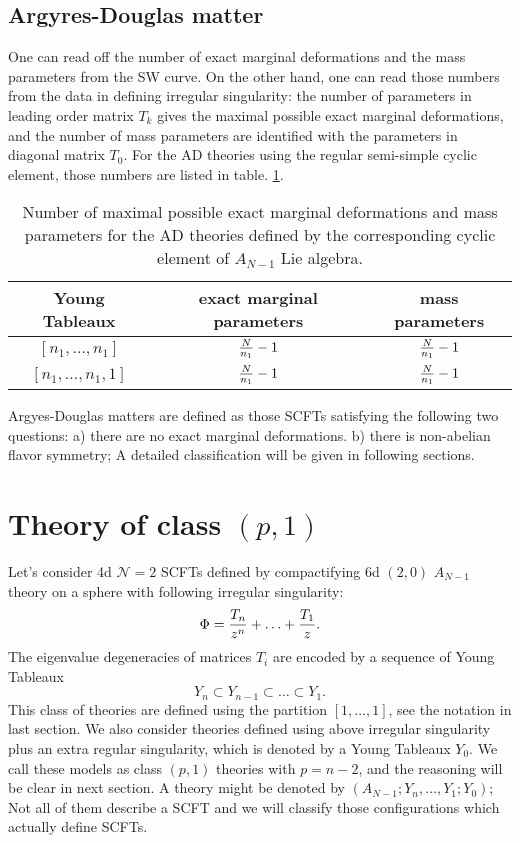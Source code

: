 \documentclass[a4paper,11pt]{article}
\begin{document}
\subsection{Argyres-Douglas matter}
One can read off the number of exact marginal deformations and the mass parameters from the SW curve. On the other hand, one can read those numbers from 
the data in defining irregular singularity: the number of parameters in leading order matrix $T_k$ gives the maximal possible exact marginal deformations, and  the number of mass parameters 
are identified with the parameters in diagonal matrix $T_0$. For the AD theories using the regular semi-simple cyclic element, those numbers  are listed in table. \ref{mass}. 
\begin{table}[!htb]
\begin{center}
\begin{tabular}{|c|c|c|}
  \hline
 Young Tableaux & exact marginal parameters & mass parameters  \\ \hline
    $ [n_1,\ldots, n_1]$ & ${{N\over n_1}}-1$ &  ${{N\over n_1}}-1$ \\ \hline
       $ [n_1,\ldots, n_1,1]$ & ${{N\over n_1}}-1$ & ${{N\over n_1}}-1$ \\ \hline
\end{tabular} 
 \caption{Number of maximal possible exact marginal deformations and mass parameters for the AD theories defined by the corresponding cyclic element of $A_{N-1}$ Lie algebra. }
       \label{mass}
\end{center}
\end{table}

Argyes-Douglas matters are defined as  those SCFTs satisfying the following two questions: a) there are no exact marginal deformations. 
b) there is non-abelian flavor symmetry; A detailed classification will be given in following sections. 





\section{Theory of class $(p,1)$} 
Let's consider 4d $\mathcal{N}=2$ SCFTs defined by compactifying 6d $(2,0)$ $A_{N-1}$ theory on a sphere with following irregular singularity: 
\begin{equation}
\Phi={T_n\over z^n}+\ldots+{T_1\over z}.
\end{equation}
The eigenvalue degeneracies of  matrices $T_i$ are encoded by a sequence of Young Tableaux
\begin{equation}
Y_n\subset Y_{n-1} \subset \ldots \subset Y_1.
\label{irrep1}
\end{equation}
This class of theories are defined using the partition $[1,\ldots, 1]$, see the notation in last section. 
We also consider theories defined using above irregular singularity plus an extra regular singularity, which is denoted by 
a Young Tableaux $Y_0$. We  call these models as class $(p,1)$ theories with $p=n-2$, and the reasoning will be clear in next section. 
A theory might be denoted by $(A_{N-1}; Y_{n},\ldots, Y_1; Y_0)$; Not all of them describe a SCFT and we will 
classify those configurations which actually define SCFTs. 
\end{document}
